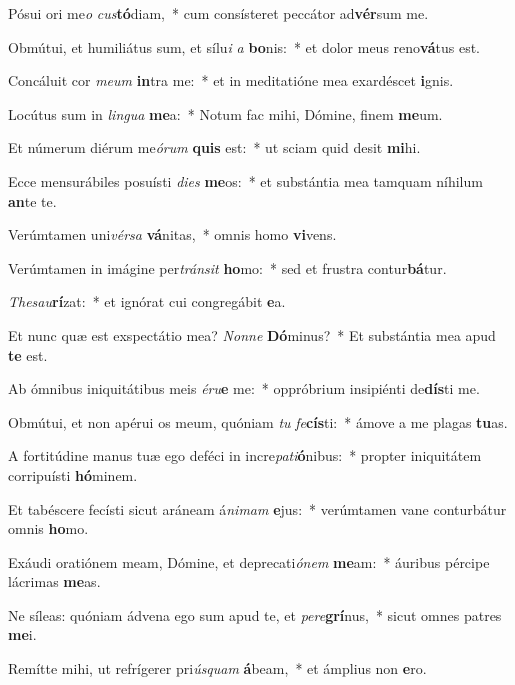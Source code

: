 \item Pósui ori me\textit{o} \textit{cus}\textbf{tó}diam,~* cum consísteret peccátor ad\textbf{vér}sum me.
\item Obmútui, et humiliátus sum, et sílu\textit{i} \textit{a} \textbf{bo}nis:~* et dolor meus reno\textbf{vá}tus est.
\item Concáluit cor \textit{me}\textit{um} \textbf{in}tra me:~* et in meditatióne mea exardéscet \textbf{i}gnis.
\item Locútus sum in \textit{lin}\textit{gua} \textbf{me}a:~* Notum fac mihi, Dómine, finem \textbf{me}um.
\item Et númerum diérum me\textit{ó}\textit{rum} \textbf{quis} est:~* ut sciam quid desit \textbf{mi}hi.
\item Ecce mensurábiles posuísti \textit{di}\textit{es} \textbf{me}os:~* et substántia mea tamquam níhilum \textbf{an}te te.
\item Verúmtamen uni\textit{vér}\textit{sa} \textbf{vá}nitas,~* omnis homo \textbf{vi}vens.
\item Verúmtamen in imágine per\textit{tráns}\textit{it} \textbf{ho}mo:~* sed et frustra contur\textbf{bá}tur.
\item \textit{The}\textit{sau}\textbf{rí}zat:~* et ignórat cui congregábit \textbf{e}a.
\item Et nunc quæ est exspectátio mea? \textit{Non}\textit{ne} \textbf{Dó}minus?~* Et substántia mea apud \textbf{te} est.
\item Ab ómnibus iniquitátibus meis \textit{é}\textit{ru}\textbf{e} me:~* oppróbrium insipiénti de\textbf{dís}ti me.
\item Obmútui, et non apérui os meum, quóniam \textit{tu} \textit{fe}\textbf{cís}ti:~* ámove a me plagas \textbf{tu}as.
\item A fortitúdine manus tuæ ego deféci in incre\textit{pa}\textit{ti}\textbf{ó}nibus:~* propter iniquitátem corripuísti \textbf{hó}minem.
\item Et tabéscere fecísti sicut aráneam á\textit{ni}\textit{mam} \textbf{e}jus:~* verúmtamen vane conturbátur omnis \textbf{ho}mo.
\item Exáudi oratiónem meam, Dómine, et deprecati\textit{ó}\textit{nem} \textbf{me}am:~* áuribus pércipe lácrimas \textbf{me}as.
\item Ne síleas: quóniam ádvena ego sum apud te, et \textit{per}\textit{e}\textbf{grí}nus,~* sicut omnes patres \textbf{me}i.
\item Remítte mihi, ut refrígerer pri\textit{ús}\textit{quam} \textbf{á}beam,~* et ámplius non \textbf{e}ro.
